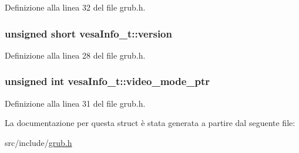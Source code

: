 Definizione alla linea 32 del file grub.\+h.

\hypertarget{structvesaInfo__t_a6c1001f337933e02a68640cfc7abdfb6}{
\subsubsection[{version}]{\setlength{\rightskip}{0pt plus 5cm}unsigned short vesa\+Info\+\_\+t\+::version}}\label{structvesaInfo__t_a6c1001f337933e02a68640cfc7abdfb6}


Definizione alla linea 28 del file grub.\+h.

\hypertarget{structvesaInfo__t_af4342c2c5c65c802e4a042d324572b9d}{
\subsubsection[{video\+\_\+mode\+\_\+ptr}]{\setlength{\rightskip}{0pt plus 5cm}unsigned int vesa\+Info\+\_\+t\+::video\+\_\+mode\+\_\+ptr}}\label{structvesaInfo__t_af4342c2c5c65c802e4a042d324572b9d}


Definizione alla linea 31 del file grub.\+h.



La documentazione per questa struct è stata generata a partire dal seguente file\+:\begin{DoxyCompactItemize}
\item 
src/include/\hyperlink{grub_8h}{grub.\+h}\end{DoxyCompactItemize}
